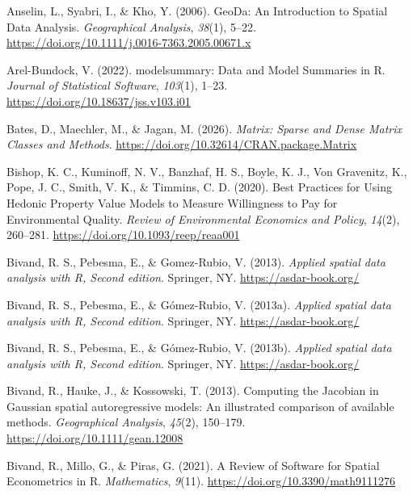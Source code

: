 \documentclass[
  norsk,
  a4paper,
]{article}
\newlength{\cslhangindent}
\newenvironment{CSLReferences}[2] %
 {\begin{list}{}{%
  \setlength{\itemindent}{0pt}
  \setlength{\leftmargin}{0pt}
  \setlength{\parsep}{0pt}
  \ifodd #1
   \setlength{\leftmargin}{\cslhangindent}
   \setlength{\itemindent}{-1\cslhangindent}
  \fi
  \setlength{\itemsep}{#2\baselineskip}}}
 {\end{list}}
\begin{document}
\protect{}\label{refs}
\begin{CSLReferences}{1}{0}
Anselin, L., Syabri, I., \& Kho, Y. (2006). GeoDa: An Introduction to
Spatial Data Analysis. \emph{Geographical Analysis}, \emph{38}(1),
5--22. \url{https://doi.org/10.1111/j.0016-7363.2005.00671.x}

Arel-Bundock, V. (2022). {modelsummary}: Data and Model Summaries in
{R}. \emph{Journal of Statistical Software}, \emph{103}(1), 1--23.
\url{https://doi.org/10.18637/jss.v103.i01}

Bates, D., Maechler, M., \& Jagan, M. (2026). \emph{{Matrix}: Sparse and
Dense Matrix Classes and Methods}.
\url{https://doi.org/10.32614/CRAN.package.Matrix}

Bishop, K. C., Kuminoff, N. V., Banzhaf, H. S., Boyle, K. J., Von
Gravenitz, K., Pope, J. C., Smith, V. K., \& Timmins, C. D. (2020). Best
{Practices} for {Using} {Hedonic} {Property} {Value} {Models} to
{Measure} {Willingness} to {Pay} for {Environmental} {Quality}.
\emph{Review of Environmental Economics and Policy}, \emph{14}(2),
260--281. \url{https://doi.org/10.1093/reep/reaa001}

Bivand, R. S., Pebesma, E., \& Gomez-Rubio, V. (2013). \emph{Applied
spatial data analysis with {R}, Second edition}. Springer, NY.
\url{https://asdar-book.org/}

Bivand, R. S., Pebesma, E., \& Gómez-Rubio, V. (2013a). \emph{Applied
spatial data analysis with {R}, Second edition}. Springer, NY.
\url{https://asdar-book.org/}

Bivand, R. S., Pebesma, E., \& Gómez-Rubio, V. (2013b). \emph{Applied
spatial data analysis with {R}, Second edition}. Springer, NY.
\url{https://asdar-book.org/}

Bivand, R., Hauke, J., \& Kossowski, T. (2013). Computing the Jacobian
in Gaussian spatial autoregressive models: An illustrated comparison of
available methods. \emph{Geographical Analysis}, \emph{45}(2), 150--179.
\url{https://doi.org/10.1111/gean.12008}

Bivand, R., Millo, G., \& Piras, G. (2021). A Review of Software for
Spatial Econometrics in {R}. \emph{Mathematics}, \emph{9}(11).
\url{https://doi.org/10.3390/math9111276}


\end{CSLReferences}
\end{document}
